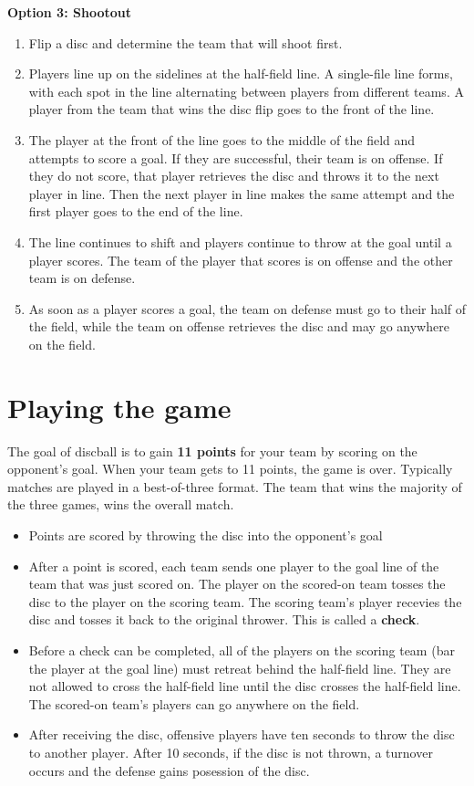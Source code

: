 \documentclass[10pt]{article}
\begin{document}
\textbf{Option 3: Shootout}
\begin{enumerate}
    \item Flip a disc and determine the team that will shoot first.
    \item Players line up on the sidelines at the half-field line. A single-file line forms, with each spot in the line alternating between players from different teams. A player from the team that wins the disc flip goes to the front of the line.
    \item The player at the front of the line goes to the middle of the field and attempts to score a goal. If they are successful, their team is on offense. If they do not score, that player retrieves the disc and throws it to the next player in line. Then the next player in line makes the same attempt and the first player goes to the end of the line.
    \item The line continues to shift and players continue to throw at the goal until a player scores. The team of the player that scores is on offense and the other team is on defense.
    \item As soon as a player scores a goal, the team on defense must go to their half of the field, while the team on offense retrieves the disc and may go anywhere on the field.
\end{enumerate}

\section{Playing the game}

The goal of discball is to gain \textbf{11 points} for your team by scoring on the opponent's goal. When your team gets to 11 points, the game is over. Typically matches are played in a best-of-three format. The team that wins the majority of the three games, wins the overall match.
\begin{itemize}
    \item Points are scored by throwing the disc into the opponent's goal
    \item After a point is scored, each team sends one player to the goal line of the team that was just scored on. The player on the scored-on team tosses the disc to the player on the scoring team. The scoring team's player recevies the disc and tosses it back to the original thrower. This is called a \textbf{check}.
    \item Before a check can be completed, all of the players on the scoring team (bar the player at the goal line) must retreat behind the half-field line. They are not allowed to cross the half-field line until the disc crosses the half-field line. The scored-on team's players can go anywhere on the field.
    \item After receiving the disc, offensive players have ten seconds to throw the disc to another player. After 10 seconds, if the disc is not thrown, a turnover occurs and the defense gains posession of the disc.
\end{itemize}
\end{document}
